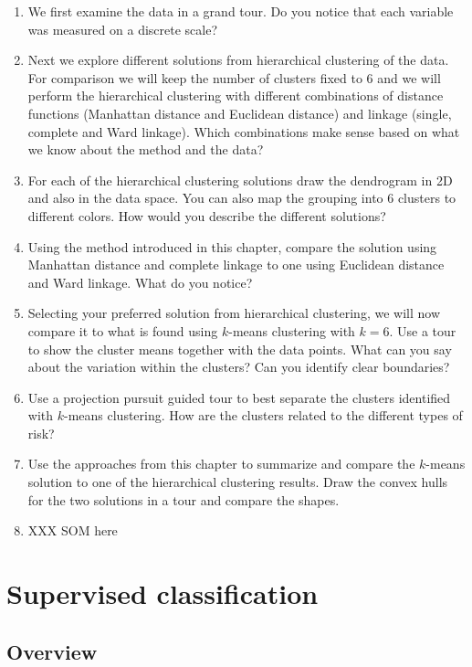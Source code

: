 \documentclass[
  letterpaper,
]{book}
\providecommand{\tightlist}{%
  \setlength{\itemsep}{0pt}\setlength{\parskip}{0pt}}\usepackage{longtable,booktabs,array}
\begin{document}
\begin{enumerate}
\def\labelenumi{\arabic{enumi}.}
\tightlist
\item
  We first examine the data in a grand tour. Do you notice that each
  variable was measured on a discrete scale?
\item
  Next we explore different solutions from hierarchical clustering of
  the data. For comparison we will keep the number of clusters fixed to
  6 and we will perform the hierarchical clustering with different
  combinations of distance functions (Manhattan distance and Euclidean
  distance) and linkage (single, complete and Ward linkage). Which
  combinations make sense based on what we know about the method and the
  data?
\item
  For each of the hierarchical clustering solutions draw the dendrogram
  in 2D and also in the data space. You can also map the grouping into 6
  clusters to different colors. How would you describe the different
  solutions?
\item
  Using the method introduced in this chapter, compare the solution
  using Manhattan distance and complete linkage to one using Euclidean
  distance and Ward linkage. What do you notice?
\item
  Selecting your preferred solution from hierarchical clustering, we
  will now compare it to what is found using \(k\)-means clustering with
  \(k=6\). Use a tour to show the cluster means together with the data
  points. What can you say about the variation within the clusters? Can
  you identify clear boundaries?
\item
  Use a projection pursuit guided tour to best separate the clusters
  identified with \(k\)-means clustering. How are the clusters related
  to the different types of risk?
\item
  Use the approaches from this chapter to summarize and compare the
  \(k\)-means solution to one of the hierarchical clustering results.
  Draw the convex hulls for the two solutions in a tour and compare the
  shapes.
\item
  XXX SOM here
\end{enumerate}

\part{Supervised classification}

\hypertarget{overview-2}{%
\chapter{Overview}\label{overview-2}}
\end{document}
